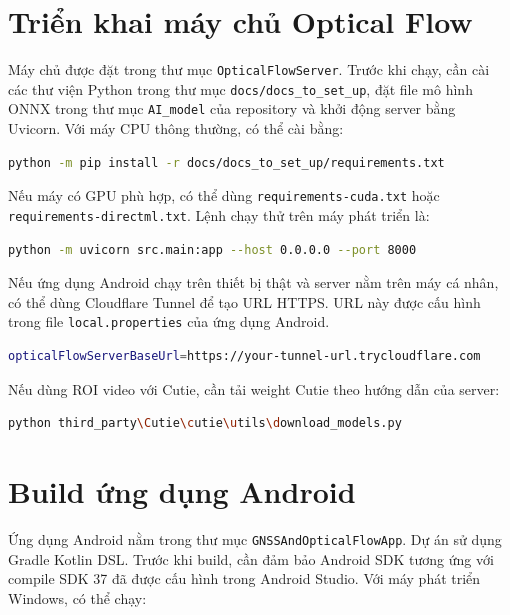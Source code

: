 \documentclass[../DoAn.tex]{subfiles}
\begin{document}
\section{Triển khai máy chủ Optical Flow}
Máy chủ được đặt trong thư mục \texttt{OpticalFlowServer}. Trước khi chạy, cần cài các thư viện Python trong thư mục \texttt{docs/docs\_to\_set\_up}, đặt file mô hình ONNX trong thư mục \texttt{AI\_model} của repository và khởi động server bằng Uvicorn. Với máy CPU thông thường, có thể cài bằng:

\begin{lstlisting}[language=bash,caption={Cài thư viện máy chủ FastAPI}]
python -m pip install -r docs/docs_to_set_up/requirements.txt
\end{lstlisting}

Nếu máy có GPU phù hợp, có thể dùng \texttt{requirements-cuda.txt} hoặc \texttt{requirements-directml.txt}. Lệnh chạy thử trên máy phát triển là:

\begin{lstlisting}[language=bash,caption={Khởi động máy chủ FastAPI}]
python -m uvicorn src.main:app --host 0.0.0.0 --port 8000
\end{lstlisting}

Nếu ứng dụng Android chạy trên thiết bị thật và server nằm trên máy cá nhân, có thể dùng Cloudflare Tunnel để tạo URL HTTPS. URL này được cấu hình trong file \texttt{local.properties} của ứng dụng Android.

\begin{lstlisting}[language=bash,caption={Cấu hình URL máy chủ cho Android}]
opticalFlowServerBaseUrl=https://your-tunnel-url.trycloudflare.com
\end{lstlisting}

Nếu dùng ROI video với Cutie, cần tải weight Cutie theo hướng dẫn của server:

\begin{lstlisting}[language=bash,caption={Tải weight Cutie cho ROI video}]
python third_party\Cutie\cutie\utils\download_models.py
\end{lstlisting}

\section{Build ứng dụng Android}
Ứng dụng Android nằm trong thư mục \texttt{GNSSAndOpticalFlowApp}. Dự án sử dụng Gradle Kotlin DSL. Trước khi build, cần đảm bảo Android SDK tương ứng với compile SDK 37 đã được cấu hình trong Android Studio. Với máy phát triển Windows, có thể chạy:
\end{document}
